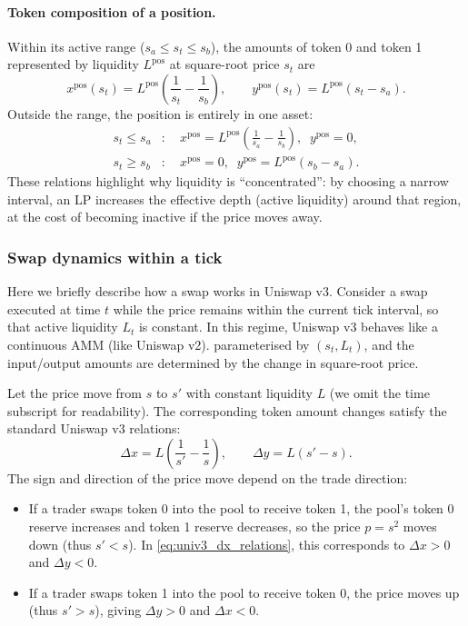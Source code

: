 \documentclass[11pt]{article}
\begin{document}
\paragraph{Token composition of a position.}
Within its active range ($s_a \le s_t \le s_b$), the amounts of token 0 and token 1 represented by liquidity $L^{\mathrm{pos}}$ at square-root price $s_t$ are
\begin{equation}
  x^{\mathrm{pos}}(s_t) = L^{\mathrm{pos}}\!\left(\frac{1}{s_t} - \frac{1}{s_b}\right),
  \qquad
  y^{\mathrm{pos}}(s_t) = L^{\mathrm{pos}}\!\left(s_t - s_a\right).
\end{equation}
Outside the range, the position is entirely in one asset:
\begin{equation}
  \begin{aligned}
    s_t \le s_a &: \quad x^{\mathrm{pos}} = L^{\mathrm{pos}}\!\left(\frac{1}{s_a} - \frac{1}{s_b}\right), \;\; y^{\mathrm{pos}}=0,\\
    s_t \ge s_b &: \quad x^{\mathrm{pos}} = 0, \;\; y^{\mathrm{pos}}= L^{\mathrm{pos}}\!\left(s_b - s_a\right).
  \end{aligned}
\end{equation}
These relations highlight why liquidity is ``concentrated'': by choosing a narrow interval, an LP increases the effective depth (active liquidity) around that region, at the cost of becoming inactive if the price moves away.

\subsubsection{Swap dynamics within a tick}
Here we briefly describe how a swap works in Uniswap v3.
Consider a swap executed at time $t$ while the price remains within the current tick interval, so that active liquidity $L_t$ is constant. In this regime, Uniswap v3 behaves like a continuous AMM (like Uniswap v2). parameterised by $(s_t, L_t)$, and the input/output amounts are determined by the change in square-root price.

Let the price move from $s$ to $s'$ with constant liquidity $L$ (we omit the time subscript for readability).
The corresponding token amount changes satisfy the standard Uniswap v3 relations:
\begin{equation}
  \Delta x = L\!\left(\frac{1}{s'} - \frac{1}{s}\right),
  \qquad
  \Delta y = L\!\left(s' - s\right).
  \label{eq:univ3_dx_relations}
\end{equation}
The sign and direction of the price move depend on the trade direction:
\begin{itemize}[leftmargin=*]
  \item If a trader swaps token 0 into the pool to receive token 1, the pool's token 0 reserve increases and token 1 reserve decreases, so the price $p=s^2$ moves down (thus $s' < s$). In \eqref{eq:univ3_dx_relations}, this corresponds to $\Delta x>0$ and $\Delta y<0$.
  \item If a trader swaps token 1 into the pool to receive token 0, the price moves up (thus $s' > s$), giving $\Delta y>0$ and $\Delta x<0$.
\end{itemize}
\end{document}
